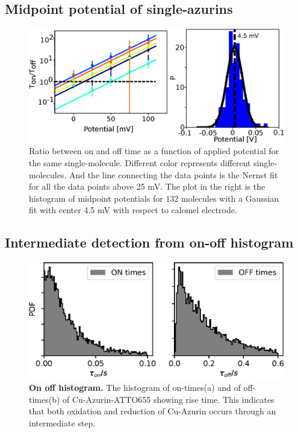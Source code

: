 \documentclass[journal=jacsat,manuscript=article]{achemso}
\begin{document}
\subsection{Midpoint potential of single-azurins}
\begin{figure}
	\includegraphics[width=\textwidth]{Figure/Figure_2_midpoint.eps}
	\caption{Ratio between on and off time as a function of applied potential for the same single-molecule. Different color represents different single-molecules. And the line connecting the data points is the Nernst fit for all the data points above 25 mV. The plot in the right is the histogram of midpoint potentials for $132$ molecules with a Gaussian fit with center 4.5 mV with respect to calomel electrode.}
	\label{fig:midpoint}
\end{figure}
\subsection{Intermediate detection from on-off histogram}
\begin{figure}
	\includegraphics[width=\textwidth]{Figure/Figure_3_on_off_1D.eps}
	\caption{\textbf{On off histogram.} The histogram of on-times(a) and of off-times(b) of Cu-Azurin-ATTO655 showing rise time. This indicates that both oxidation and reduction of Cu-Azurin occurs through an intermediate step.}
	\label{fig:onoff1D}
\end{figure}
\end{document}
